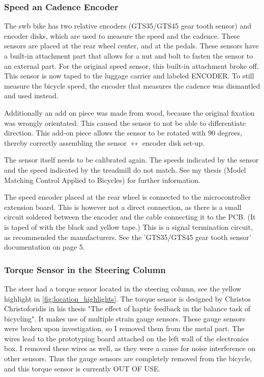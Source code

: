 \subsubsection{Speed an Cadence Encoder}
The swb bike has two relative encoders (GTS35/GTS45 gear tooth sensor) and encoder disks, which are used to measure the speed and the cadence.
These sensors are placed at the rear wheel center, and at the pedals.
These sensors have a built-in attachment part that allows for a nut and bolt to fasten the sensor to an external part. 
For the original speed sensor, this built-in attachment broke off. 
This sensor is now taped to the luggage carrier and labeled ENCODER. 
To still measure the bicycle speed, the encoder that measures the cadence was dismantled and used instead. 

Additionally an add on piece was made from wood, because the original fixation was wrongly orientated.
This caused the sensor to not be able to differentiate direction. 
This add-on piece allows the sensor to be rotated with 90 degrees, thereby correctly assembling the sensor $\longleftrightarrow$ encoder disk set-up.

The sensor itself needs to be calibrated again. The speeds indicated by the sensor and the speed indicated by the treadmill do not match. 
See my thesis (Model Matching Control Applied to Bicycles) for further information.

The speed encoder placed at the rear wheel is connected to the microcontroller extension board. %
This is however not a direct connection, as there is a small circuit soldered between the encoder and the cable connecting it to the PCB. 
(It is taped of with the black and yellow tape.) 
This is a signal termination circuit, as recommended the manufacturers. 
See the 'GTS35/GTS45 gear tooth sensor' documentation on page 5.

\subsubsection{Torque Sensor in the Steering Column} \label{sec:steer_torque_sensor}
The steer had a torque sensor located in the steering column, see the yellow highlight in \autoref{fig:location_highlights}.
The torque sensor is designed by Christos Christoforidis in his thesis "The effect of haptic feedback in the balance task of bicycling". 
It makes use of multiple strain gauge sensors. 
These gauge sensors were broken upon investigation, so I removed them from the metal part. 
The wires lead to the prototyping board attached on the left wall of the electronics box. 
I removed these wires as well, as they were a cause for noise interference on other sensors.
Thus the gauge sensors are completely removed from the bicycle, and this torque sensor is currently OUT OF USE. 


